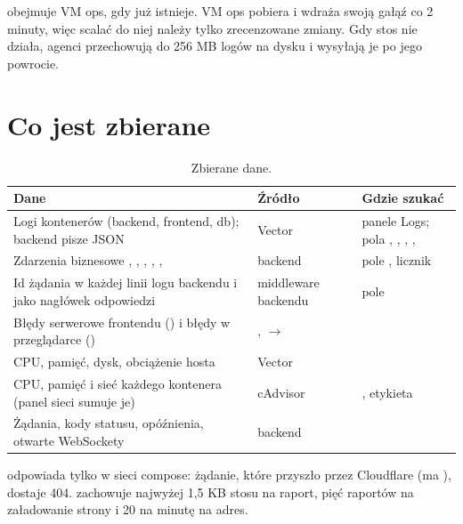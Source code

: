  obejmuje VM ops, gdy już istnieje. VM ops
pobiera i wdraża swoją gałąź co 2 minuty, więc scalać do niej należy tylko
zrecenzowane zmiany. Gdy stos nie działa, agenci przechowują do 256 MB logów na
dysku i wysyłają je po jego powrocie.

\section{Co jest zbierane}

\begin{table}[H]
\centering\small
\begin{tabularx}{\textwidth}{@{}p{}p{}Y@{}}
\toprule
\textbf{Dane} & \textbf{Źródło} & \textbf{Gdzie szukać} \\
\midrule
Logi kontenerów (backend, frontend, db); backend pisze JSON & Vector  & panele Logs; pola , , , ,  \\
Zdarzenia biznesowe , , , , ,  & backend  & pole , licznik  \\
Id żądania w każdej linii logu backendu i jako nagłówek odpowiedzi  & middleware backendu & pole  \\
Błędy serwerowe frontendu () i błędy w przeglądarce () & ,  $\rightarrow$  &  \\
CPU, pamięć, dysk, obciążenie hosta & Vector  &  \\
CPU, pamięć i sieć każdego kontenera (panel sieci sumuje je) & cAdvisor & , etykieta  \\
Żądania, kody statusu, opóźnienia, otwarte WebSockety & backend  &  \\
\bottomrule
\end{tabularx}
\caption{Zbierane dane.}
\end{table}

 odpowiada tylko w sieci compose: żądanie, które przyszło przez
Cloudflare (ma ), dostaje 404.  zachowuje
najwyżej 1,5 KB stosu na raport, pięć raportów na załadowanie strony i 20 na minutę
na adres.

